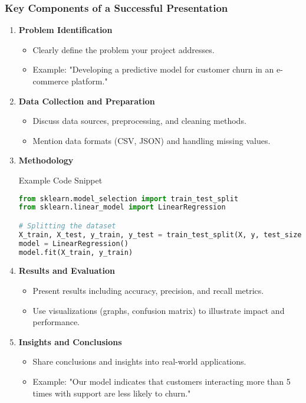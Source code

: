 \documentclass[aspectratio=169]{beamer}
\begin{document}
\begin{frame}[fragile]
    \frametitle{Key Components of a Successful Presentation}
    \begin{enumerate}
        \item \textbf{Problem Identification}
            \begin{itemize}
                \item Clearly define the problem your project addresses.
                \item Example: "Developing a predictive model for customer churn in an e-commerce platform."
            \end{itemize}
        \item \textbf{Data Collection and Preparation}
            \begin{itemize}
                \item Discuss data sources, preprocessing, and cleaning methods.
                \item Mention data formats (CSV, JSON) and handling missing values.
            \end{itemize}
        \item \textbf{Methodology}
            \begin{block}{Example Code Snippet}
            \begin{lstlisting}[language=Python]
from sklearn.model_selection import train_test_split
from sklearn.linear_model import LinearRegression

# Splitting the dataset
X_train, X_test, y_train, y_test = train_test_split(X, y, test_size=0.2, random_state=42)
model = LinearRegression()
model.fit(X_train, y_train)
            \end{lstlisting}
            \end{block}
        \item \textbf{Results and Evaluation}
            \begin{itemize}
                \item Present results including accuracy, precision, and recall metrics.
                \item Use visualizations (graphs, confusion matrix) to illustrate impact and performance.
            \end{itemize}
        \item \textbf{Insights and Conclusions}
            \begin{itemize}
                \item Share conclusions and insights into real-world applications.
                \item Example: "Our model indicates that customers interacting more than 5 times with support are less likely to churn."
            \end{itemize}
    \end{enumerate}
\end{frame}
\end{document}
